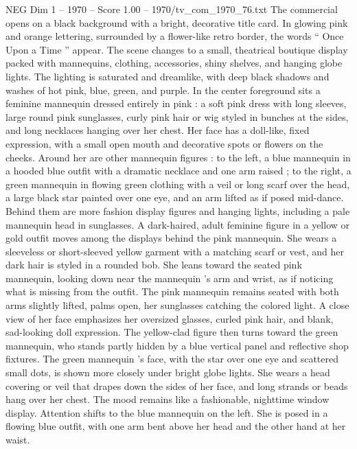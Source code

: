 \begin{textsample}{NEG Dim 1 – 1970 – Score 1.00 – 1970/tv\_com\_1970\_76.txt}  \label{ex:f1_neg_039}
The commercial opens on a black background with a bright, decorative title card.
In glowing pink and orange lettering, surrounded by a flower-like retro border, the words “ Once Upon a Time ” appear.
The scene changes to a small, theatrical boutique display packed with mannequins, clothing, accessories, shiny shelves, and hanging globe lights.
The lighting is saturated and dreamlike, with deep black shadows and washes of hot pink, blue, green, and purple.
In the center foreground sits a feminine mannequin dressed entirely in pink : a soft pink dress with long sleeves, large round pink sunglasses, curly pink hair or wig styled in bunches at the sides, and long necklaces hanging over her chest.
Her face has a doll-like, fixed expression, with a small open mouth and decorative spots or flowers on the cheeks.
Around her are other mannequin figures : to the left, a blue mannequin in a hooded blue outfit with a dramatic necklace and one arm raised ; to the right, a green mannequin in flowing green clothing with a veil or long scarf over the head, a large black star painted over one eye, and an arm lifted as if posed mid-dance.
Behind them are more fashion display figures and hanging lights, including a pale mannequin head in sunglasses.
A dark-haired, adult feminine figure in a yellow or gold outfit moves among the displays behind the pink mannequin.
She wears a sleeveless or short-sleeved yellow garment with a matching scarf or vest, and her dark hair is styled in a rounded bob.
She leans toward the seated pink mannequin, looking down near the mannequin ’s arm and wrist, as if noticing what is missing from the outfit.
The pink mannequin remains seated with both arms slightly lifted, palms open, her sunglasses catching the colored light.
A close view of her face emphasizes her oversized glasses, curled pink hair, and blank, sad-looking doll expression.
The yellow-clad figure then turns toward the green mannequin, who stands partly hidden by a blue vertical panel and reflective shop fixtures.
The green mannequin ’s face, with the star over one eye and scattered small dots, is shown more closely under bright globe lights.
She wears a head covering or veil that drapes down the sides of her face, and long strands or beads hang over her chest.
The mood remains like a fashionable, nighttime window display.
Attention shifts to the blue mannequin on the left.
She is posed in a flowing blue outfit, with one arm bent above her head and the other hand at her waist.

\end{textsample}
